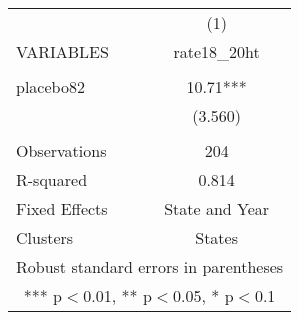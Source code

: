 \begin{tabular}{lc} \hline
 & (1) \\
VARIABLES & rate18\_20ht \\ \hline
 &  \\
placebo82 & 10.71*** \\
 & (3.560) \\
 &  \\
Observations & 204 \\
R-squared & 0.814 \\
Fixed Effects & State and Year \\
 Clusters & States \\ \hline
\multicolumn{2}{c}{ Robust standard errors in parentheses} \\
\multicolumn{2}{c}{ *** p$<$0.01, ** p$<$0.05, * p$<$0.1} \\
\end{tabular}
